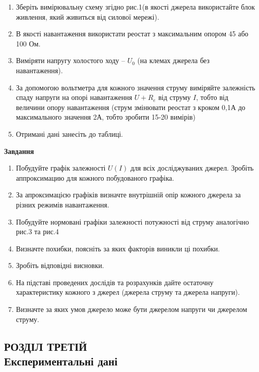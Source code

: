 \documentclass[a4paper,12pt]{article}
\newcommand{\re}{R_e}
\newcommand{\uo}{U_0}
\begin{document}
	\begin{enumerate}
		\item Зберіть вимірювальну схему згідно рис.1(в якості джерела використайте блок живлення, який живиться від силової мережі). 
		\item В якості навантаження використати реостат з максимальним опором 45 або 100 Ом. 
		\item Виміряти напругу холостого ходу – $\uo$ (на клемах джерела без навантаження). 
		\item За допомогою вольтметра для кожного значення струму виміряйте залежність спаду напруги на опорі навантаження $U+{\re}$ від струму $I$, тобто від величини опору навантаження (струм змінювати реостат з кроком 0,1А до максимального значення 2А, тобто зробити 15-20 вимірів) 
		\item Отримані дані занесіть до таблиці. 
	\end{enumerate}

\newpage
	\begin{center}
		\textbf{Завдання}
	\end{center}
	\begin{enumerate}
		\item Побудуйте графік залежності $U(I)$ для всіх досліджуваних джерел. Зробіть аппроксимацию для кожного побудованого графіка. 
		\item За апроксимацією графіків визначте внутрішній опір кожного джерела за різних режимів навантаження. 
		\item Побудуйте нормовані графіки залежності потужності від струму аналогічно рис.3 та рис.4 
		\item Визначте похибки, поясніть за яких факторів виникли ці похибки. 
		\item Зробіть відповідні висновки. 
		\item На підставі проведених дослідів та розрахунків дайте остаточну характеристику кожного з джерел (джерела струму та джерела напруги). 
		\item Визначте за яких умов джерело може бути джерелом напруги чи джерелом струму. 
	\end{enumerate}
	
\newpage
	\begin{center}
		\section* {РОЗДІЛ ТРЕТІЙ\\Експериментальні дані}
	\end{center}
	
\end{document}
